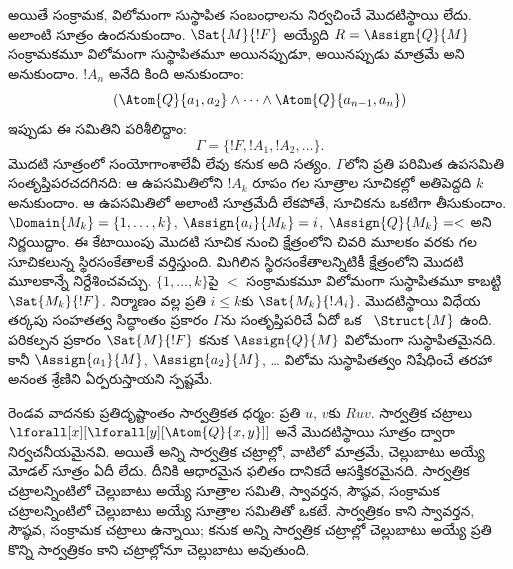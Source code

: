 \documentclass[../../../include/open-logic-section]{subfiles}
\begin{document}
అయితే సంక్రామక, విలోమంగా సుస్థాపిత సంబంధాలను
నిర్వచించే మొదటిస్థాయి  లేదు.
అలాంటి సూత్రం ఉందనుకుందాం. $\Sat{M}{!F}$ అయ్యేది
$R = \Assign{Q}{M}$ సంక్రామకమూ విలోమంగా సుస్థాపితమూ
అయినప్పుడూ, అయినప్పుడు మాత్రమే అని అనుకుందాం. $!A_n$ అనేది కింది 
అనుకుందాం:
\[
(\Atom{Q}{a_1,a_2} \land \dots \land
    \Atom{Q}{a_{n-1},a_{n}})
\]
ఇప్పుడు ఈ  సమితిని పరిశీలిద్దాం:
\[
\Gamma = \{!F, !A_1, !A_2, \dots\}.
\]
మొదటి సూత్రంలో సంయోగాంశాలేవీ లేవు కనుక అది సత్యం.
$\Gamma$లోని ప్రతి పరిమిత ఉపసమితి సంతృప్తిపరచదగినది:
ఆ ఉపసమితిలోని $!A_k$ రూపం గల సూత్రాల సూచికల్లో
అతిపెద్దది $k$ అనుకుందాం. ఆ ఉపసమితిలో అలాంటి సూత్రమేదీ
లేకపోతే, సూచికను ఒకటిగా తీసుకుందాం. $\Domain{M_k} = \{1, \dots, k\}$,
$\Assign{a_i}{M_k} = i$, $\Assign{Q}{M_k} = <$ అని
నిర్ణయిద్దాం. ఈ కేటాయింపు మొదటి సూచిక నుంచి క్షేత్రంలోని చివరి
మూలకం వరకు గల సూచికలున్న స్థిరసంకేతాలకే వర్తిస్తుంది. మిగిలిన స్థిరసంకేతాలన్నిటికీ
క్షేత్రంలోని మొదటి మూలకాన్నే నిర్దేశించవచ్చు.
$\{1, \dots, k\}$పై $<$ సంక్రామకమూ
విలోమంగా సుస్థాపితమూ కాబట్టి $\Sat{M_k}{!F}$.
నిర్మాణం వల్ల ప్రతి $i \le k$కు $\Sat{M_k}{!A_i}$.
మొదటిస్థాయి విధేయ తర్కపు సంహతత్వ సిద్ధాంతం ప్రకారం
$\Gamma$ను సంతృప్తిపరిచే ఏదో ఒక
~$\Struct{M}$ ఉంది.
పరికల్పన ప్రకారం $\Sat{M}{!F}$ కనుక $\Assign{Q}{M}$
విలోమంగా సుస్థాపితమైనది. కానీ
$\Assign{a_1}{M}$, $\Assign{a_2}{M}$, \dots{}
విలోమ సుస్థాపితత్వం నిషేధించే తరహా అనంత శ్రేణిని
ఏర్పరుస్తాయని స్పష్టమే.

రెండవ వాదనకు ప్రతిదృష్టాంతం సార్వత్రికత ధర్మం:
ప్రతి $u$, $v$కు $Ruv$. సార్వత్రిక చట్రాలు
$\lforall[x][\lforall[y][\Atom{Q}{x,y}]]$ అనే
మొదటిస్థాయి సూత్రం ద్వారా నిర్వచనీయమైనవి.
అయితే అన్ని సార్వత్రిక చట్రాల్లో, వాటిలో మాత్రమే,
చెల్లుబాటు అయ్యే మోడల్ సూత్రం ఏదీ లేదు. దీనికి ఆధారమైన ఫలితం
దానికదే ఆసక్తికరమైనది. సార్వత్రిక చట్రాలన్నింటిలో
చెల్లుబాటు అయ్యే సూత్రాల సమితి, స్వావర్తన, సౌష్ఠవ,
సంక్రామక చట్రాలన్నింటిలో చెల్లుబాటు అయ్యే సూత్రాల
సమితితో ఒకటే. సార్వత్రికం కాని
స్వావర్తన, సౌష్ఠవ, సంక్రామక చట్రాలు ఉన్నాయి; కనుక
అన్ని సార్వత్రిక చట్రాల్లో చెల్లుబాటు అయ్యే ప్రతి
 కొన్ని సార్వత్రికం కాని
చట్రాల్లోనూ చెల్లుబాటు అవుతుంది.
\end{document}
